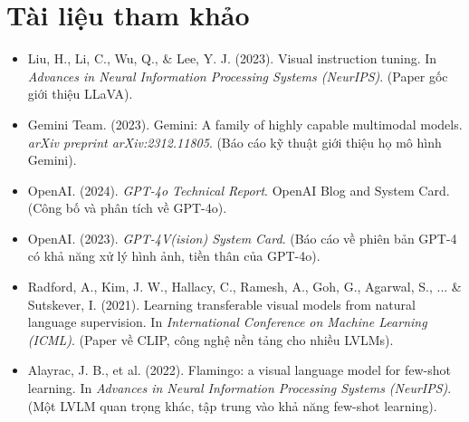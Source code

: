\section*{Tài liệu tham khảo}
\begin{itemize}
	\item[1] Liu, H., Li, C., Wu, Q., \& Lee, Y. J. (2023). Visual instruction tuning. In \textit{Advances in Neural Information Processing Systems (NeurIPS)}. (Paper gốc giới thiệu LLaVA).
	\item[2] Gemini Team. (2023). Gemini: A family of highly capable multimodal models. \textit{arXiv preprint arXiv:2312.11805}. (Báo cáo kỹ thuật giới thiệu họ mô hình Gemini).
	\item[3] OpenAI. (2024). \textit{GPT-4o Technical Report}. OpenAI Blog and System Card. (Công bố và phân tích về GPT-4o).
	\item[4] OpenAI. (2023). \textit{GPT-4V(ision) System Card}. (Báo cáo về phiên bản GPT-4 có khả năng xử lý hình ảnh, tiền thân của GPT-4o).
	\item[5] Radford, A., Kim, J. W., Hallacy, C., Ramesh, A., Goh, G., Agarwal, S., ... \& Sutskever, I. (2021). Learning transferable visual models from natural language supervision. In \textit{International Conference on Machine Learning (ICML)}. (Paper về CLIP, công nghệ nền tảng cho nhiều LVLMs).
	\item[6] Alayrac, J. B., et al. (2022). Flamingo: a visual language model for few-shot learning. In \textit{Advances in Neural Information Processing Systems (NeurIPS)}. (Một LVLM quan trọng khác, tập trung vào khả năng few-shot learning).
\end{itemize}